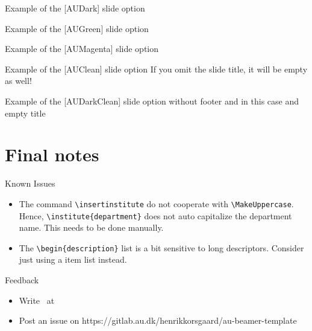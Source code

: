 \documentclass[aspectratio=169]{beamer}
\begin{document}
\begin{frame}[AUDark]{Example of the [AUDark] slide option}
\end{frame}

\begin{frame}[AUGreen]{Example of the [AUGreen] slide option}
\end{frame}

\begin{frame}[AUMagenta]{Example of the [AUMagenta] slide option}
\end{frame}

\begin{frame}[AUClean]{Example of the [AUClean] slide option}
\centering
If you omit the slide title, it will be empty as well!
\end{frame}

\begin{frame}[AUDarkClean]{}
\centering
\huge Example of the [AUDarkClean] slide option without footer and in this case and empty title
\end{frame}

\section{Final notes}
\begin{frame}[fragile]{Known Issues}
    \begin{itemize}
        \item The command \verb=\insertinstitute= do not cooperate with \verb=\MakeUppercase=. Hence, \verb=\institute{department}= does not auto capitalize the department name. This needs to be done manually.
        \item The \verb=\begin{description}= list is a bit sensitive to long descriptors. Consider just using a item list instead.
    \end{itemize}
\end{frame}

\begin{frame}[AUDark]{Feedback}
    \begin{itemize}
        \item Write \insertauthor\ at \insertshortauthor\\
        \item Post an issue on https://gitlab.au.dk/henrikkorsgaard/au-beamer-template
    \end{itemize}
\end{frame}
\end{document}

